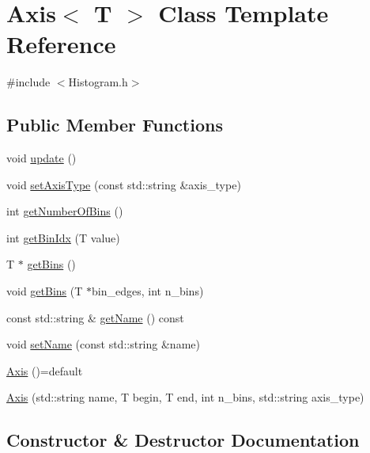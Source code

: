 \hypertarget{class_axis}{}\section{Axis$<$ T $>$ Class Template Reference}
\label{class_axis}


{\ttfamily \#include $<$Histogram.\+h$>$}

\subsection*{Public Member Functions}
\begin{DoxyCompactItemize}
\item 
void \hyperlink{class_axis_ae490ee3fdbdfb9a189281f40fc43798c}{update} ()
\item 
void \hyperlink{class_axis_ab770c647c999bc91ec01fd810ba4f17a}{set\+Axis\+Type} (const std\+::string \&axis\+\_\+type)
\item 
int \hyperlink{class_axis_a0e7c39c0886672e26fc8f374b2062790}{get\+Number\+Of\+Bins} ()
\item 
int \hyperlink{class_axis_ac19c94d0b42cbe7129d0218bcc6156a0}{get\+Bin\+Idx} (T value)
\item 
T $\ast$ \hyperlink{class_axis_a7883af78a19bf5b90e8bd3f01663a1e0}{get\+Bins} ()
\item 
void \hyperlink{class_axis_ad43663e7353a53557422b5902b4102d0}{get\+Bins} (T $\ast$bin\+\_\+edges, int n\+\_\+bins)
\item 
const std\+::string \& \hyperlink{class_axis_a26c562988320fa30f0bfbbc44c6f4bda}{get\+Name} () const
\item 
void \hyperlink{class_axis_acbe541be65dfbd06454a819782330942}{set\+Name} (const std\+::string \&name)
\item 
\hyperlink{class_axis_acd2c7884f92d1b2937bb2370d691b0fe}{Axis} ()=default
\item 
\hyperlink{class_axis_a2c03face6176cce979d869a0dc615a5c}{Axis} (std\+::string name, T begin, T end, int n\+\_\+bins, std\+::string axis\+\_\+type)
\end{DoxyCompactItemize}


\subsection{Constructor \& Destructor Documentation}
\mbox{\label{class_axis_acd2c7884f92d1b2937bb2370d691b0fe}} 
